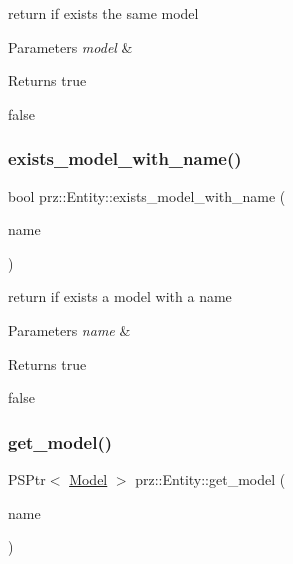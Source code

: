 return if exists the same model 


\begin{DoxyParams}{Parameters}
{\em model} & \\
\hline
\end{DoxyParams}
\begin{DoxyReturn}{Returns}
true 

false 
\end{DoxyReturn}
\mbox{\label{classprz_1_1_entity_afd5b573b1cf1bd50bd9831facb66b3da}} 
\subsubsection{\texorpdfstring{exists\_model\_with\_name()}{exists\_model\_with\_name()}}
{\footnotesize\ttfamily bool prz\+::\+Entity\+::exists\+\_\+model\+\_\+with\+\_\+name (\begin{DoxyParamCaption}\item[{const P\+String \&}]{name }\end{DoxyParamCaption})\hspace{0.3cm}{\ttfamily [inline]}}



return if exists a model with a name 


\begin{DoxyParams}{Parameters}
{\em name} & \\
\hline
\end{DoxyParams}
\begin{DoxyReturn}{Returns}
true 

false 
\end{DoxyReturn}
\mbox{\label{classprz_1_1_entity_a9596c8a874c25cb930360b4dacaf7188}} 
\subsubsection{\texorpdfstring{get\_model()}{get\_model()}}
{\footnotesize\ttfamily P\+S\+Ptr$<$ \mbox{\hyperlink{classprz_1_1_model}{Model}} $>$ prz\+::\+Entity\+::get\+\_\+model (\begin{DoxyParamCaption}\item[{const P\+String \&}]{name }\end{DoxyParamCaption})\hspace{0.3cm}{\ttfamily [inline]}}



